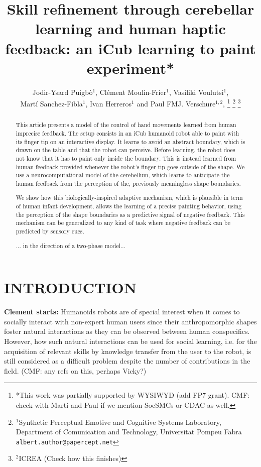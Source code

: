 \documentclass[letterpaper, 10 pt, conference]{ieeeconf}  %
\title{\LARGE \bf
Skill refinement through cerebellar learning and human haptic feedback:
an iCub learning to paint experiment*
}
\author{Jodir-Ysard Puigb\`o$^{1}$, Cl\'{e}ment Moulin-Frier$^{1}$, Vasiliki Voulutsi$^{1}$,\\ Mart\'i Sanchez-Fibla$^{1}$, Ivan Herreros$^{1}$ and Paul FMJ. Verschure$^{1,2}$, %
\thanks{*This work was partially supported by WYSIWYD (add FP7 grant). CMF: check with Marti and Paul if we mention SocSMCs or CDAC as well. }%
\thanks{$^{1}$Synthetic Perceptual Emotive and Cognitive Systems Laboratory, Department of Comunication and Technology, Universitat Pompeu Fabra
        {\tt\small albert.author@papercept.net}}%
\thanks{$^{2}$ICREA (Check how this finishes)
        }%
}
\begin{document}
\maketitle
\thispagestyle{empty}
\pagestyle{empty}


\begin{abstract}
This article presents a model of the control of hand movements learned from human imprecise feedback. 
The setup consists in an iCub humanoid robot able to paint with its finger tip on an interactive display. It learns to avoid an abstract boundary, which is drawn on the table and that the robot can perceive. Before learning, the robot does not know that it has to paint only inside the boundary. This is instead learned from human feedback provided whenever the robot’s finger tip goes outside of the shape. We use a neurocomputational model of the cerebellum, which learns to anticipate the human feedback from the perception of the, previously meaningless shape boundaries. 

We show how this biologically-inspired adaptive mechanism, which is plausible in term of human infant development, allows the learning of a precise painting behavior, using the perception of the shape boundaries as a predictive signal of negative feedback. This mechanism can be generalized to any kind of task where negative feedback can be predicted by sensory cues.


... in the direction of a two-phase model...


\end{abstract}



\section{INTRODUCTION}

\textbf{Clement starts:} Humanoids robots are of special interest when it comes to socially interact with non-expert human users since their anthropomorphic shapes foster natural interactions as they can be observed between human conspecifics. However, how such natural interactions can be used for social learning, i.e. for the acquisition of relevant skills by knowledge transfer from the user to the robot, is still considered as a difficult problem despite the number of contributions in the field. (CMF: any refs on this, perhaps Vicky?)
\end{document}
